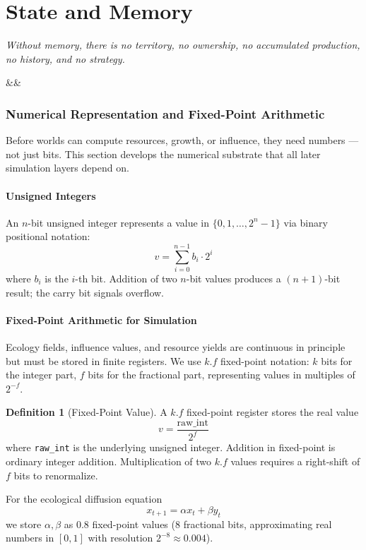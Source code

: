 \documentclass[11pt,a4paper,openany]{book}
\theoremstyle{plain}
\theoremstyle{definition}
\newtheorem{definition}[theorem]{Definition}
\theoremstyle{remark}
\newcommand{\chapterquote}[2]{%
  \par\vspace{0.8em}%
  \begin{flushright}%
    \begin{minipage}{0.65\textwidth}%
      {\itshape #1\par}%
      \ifx&#2&\else\vspace{0.3em}{\raggedleft\small--- #2\par}\fi%
    \end{minipage}%
  \end{flushright}%
  \vspace{0.8em}\par\noindent}
\begin{document}
\part{State and Memory}

\chapterquote{Without memory, there is no territory, no ownership,
  no accumulated production, no history, and no strategy.
}{}


\section{Numerical Representation and Fixed-Point Arithmetic}
\label{sec:fixedpoint}

Before worlds can compute resources, growth, or influence, they need numbers
--- not just bits. This section develops the numerical substrate that all
later simulation layers depend on.

\subsection{Unsigned Integers}

An $n$-bit unsigned integer represents a value in $\{0, 1, \ldots, 2^n - 1\}$
via binary positional notation:
\[
  v = \sum_{i=0}^{n-1} b_i \cdot 2^i
\]
where $b_i$ is the $i$-th bit. Addition of two $n$-bit values produces a
$(n+1)$-bit result; the carry bit signals overflow.

\subsection{Fixed-Point Arithmetic for Simulation}

Ecology fields, influence values, and resource yields are continuous in
principle but must be stored in finite registers. We use $k.f$ fixed-point
notation: $k$ bits for the integer part, $f$ bits for the fractional part,
representing values in multiples of $2^{-f}$.

\begin{definition}[Fixed-Point Value]
  A $k.f$ fixed-point register stores the real value
  \[
    v = \frac{\text{raw\_int}}{2^f}
  \]
  where \texttt{raw\_int} is the underlying unsigned integer.
  Addition in fixed-point is ordinary integer addition. Multiplication
  of two $k.f$ values requires a right-shift of $f$ bits to renormalize.
\end{definition}

For the ecological diffusion equation
\[
  x_{t+1} = \alpha x_t + \beta y_t
\]
we store $\alpha, \beta$ as 0.8 fixed-point values (8 fractional bits,
approximating real numbers in $[0,1]$ with resolution $2^{-8} \approx 0.004$).
\end{document}
